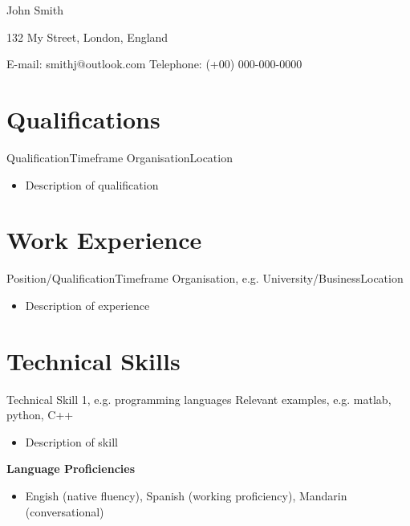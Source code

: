 \documentclass{articleCV}
\begin{document}
\begin{centering}
  {\Huge John Smith \par}
  \vspace{0.5\baselineskip}
  132 My Street, London, England \par
  \vspace{0.5\baselineskip}
  E-mail: smithj@outlook.com \quad Telephone: (+00) 000-000-0000 \par
\end{centering}

\vspace{\baselineskip}


\section{Qualifications}

\tab
  {Qualification}{Timeframe}
  {Organisation}{Location}
  \begin{itemize}
    \item Description of qualification
  \end{itemize}


\section{Work Experience}

\tab
  {Position/Qualification}{Timeframe}
  {Organisation, e.g. University/Business}{Location}
  \begin{itemize}
    	\item Description of experience
  \end{itemize}


\section{Technical Skills}

\tab
  {Technical Skill 1, e.g. programming languages}{}
  {Relevant examples, e.g. matlab, python, C++}{}
  \begin{itemize}
    \item Description of skill
  \end{itemize}
    
\textbf{Language Proficiencies}
  \begin{itemize}
    \item Engish (native fluency), Spanish (working proficiency), Mandarin (conversational)
  \end{itemize}
\end{document}
